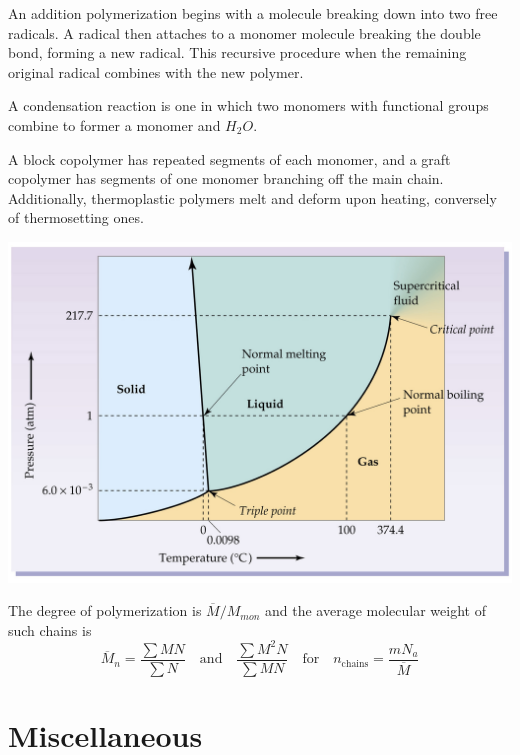 \documentclass{tufte-book}
\begin{document}
\bigskip
An addition polymerization begins with a molecule breaking down into two free radicals. A radical then attaches to a monomer molecule breaking the double bond, forming a new radical. This recursive procedure when the remaining original radical combines with the new polymer.

\bigskip
A condensation reaction is one in which two monomers with functional groups combine to former a monomer and $H_2O$.

\bigskip
A block copolymer has repeated segments of each monomer, and a graft copolymer has segments of one monomer branching off the main chain. Additionally, thermoplastic polymers melt and deform upon heating, conversely of thermosetting ones.
%
\begin{marginfigure}[0mm]
\begin{center}
  \includegraphics[width=\textwidth]{phases}
\end{center}
\end{marginfigure}

\bigskip
The degree of polymerization is $\overline M / M_{mon}$ and the average molecular weight of such chains is
\begin{equation}
  \overline M_n = \frac{\sum MN}{\sum N} \quad\text{and}\quad \frac{\sum M^2 N}{\sum MN} \quad\text{for}\quad n_{\mathrm{chains}} = \frac{m N_a}{\overline M}
\end{equation}

\chapter{Miscellaneous}
\end{document}
